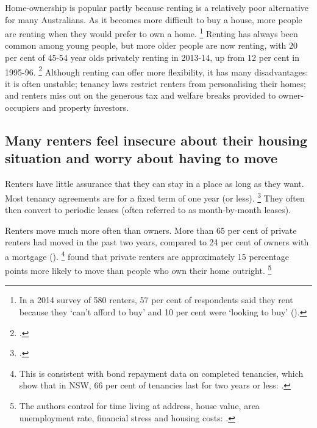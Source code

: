 Home-ownership is popular partly because renting is a relatively poor alternative for many Australians.
As it becomes more difficult to buy a house, more people are renting when they would prefer to own a home.%
	\footnote{In a 2014 survey of 580 renters, 57 per cent of respondents said they rent because they `can't afford to buy' and 10 per cent were `looking to buy' (\textcite{NSW-Tenants-Union-2014-Survey-report}).}
Renting has always been common among young people, but more older people are now renting, with 20 per cent of 45-54 year olds privately renting in 2013-14, up from 12 per cent in 1995-96.%
	\footcites{ABS-SIH-Microdata-200506}{ABS-SIH-Microdata-200708}{ABS-SIH-Microdata-201112}{ABS-HES-201516-Microdata}
Although renting can offer more flexibility, it has many disadvantages: it is often unstable; tenancy laws restrict renters from personalising their homes; and renters miss out on the generous tax and welfare breaks provided to owner-occupiers and property investors.

\subsection{Many renters feel insecure about their housing situation and worry about having to move}\label{subsec:many-renters-have-little-control-over-when-they-have-to-move-house}

Renters have little assurance that they can stay in a place as long as they want.
Most tenancy agreements are for a fixed term of one year (or less).%
	\footcites{Natl-Shelter-2017-Life-in-Aust-private-rental-market}{AHURI-2017-Do-long-leases-long-tenancies}
They often then convert to periodic leases (often referred to as month-by-month leases).

Renters move much more often than owners.
More than 65 per cent of private renters had moved in the past two years, compared to 24 per cent of owners with a mortgage ().%
	\footnote{This is consistent with bond repayment data on completed tenancies, which show that in NSW, 66 per cent of tenancies last for two years or less: \textcite{AHURI-2017-Do-long-leases-long-tenancies}.}
\textcite{OngEtAl-AHURI-2017-Housing-supply-responsiveness} found that private renters are approximately 15 percentage points more likely to move than people who own their home outright.%
	\footnote{The authors control for time living at address, house value, area unemployment rate, financial stress and housing costs: \textcite[][50]{OngEtAl-AHURI-2017-Housing-supply-responsiveness}.} 

